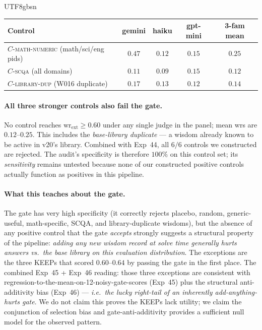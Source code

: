 \documentclass{article}
\begin{document}
\begin{CJK*}{UTF8}{gbsn}
\begin{center}\small
\begin{tabular}{l c c c c}
  \toprule
  Control & gemini & haiku & gpt-mini & 3-fam mean \\
  \midrule
  \(C\)-\textsc{math-numeric} (math/sci/eng pids) & \(0.47\) & \(0.12\) & \(0.15\) & \(0.25\) \\
  \(C\)-\textsc{scqa} (all domains)               & \(0.11\) & \(0.09\) & \(0.15\) & \(0.12\) \\
  \(C\)-\textsc{library-dup} (W016 duplicate)     & \(0.17\) & \(0.13\) & \(0.12\) & \(0.14\) \\
  \bottomrule
\end{tabular}
\end{center}

\paragraph{All three stronger controls also fail the gate.} No
control reaches \(\mathrm{wr}_{\mathrm{ext}} \geq 0.60\) under any
single judge in the panel; mean wrs are \(0.12\)--\(0.25\). This
includes the \emph{base-library duplicate} --- a wisdom already
known to be active in v20's library. Combined with Exp~44, all
\(6/6\) controls we constructed are rejected. The audit's
specificity is therefore \(100\%\) on this control set; its
\emph{sensitivity} remains untested because none of our
constructed positive controls actually function as positives in
this pipeline.

\paragraph{What this teaches about the gate.} The gate has very
high specificity (it correctly rejects placebo, random,
generic-useful, math-specific, SCQA, and library-duplicate
wisdoms), but the absence of any positive control that the gate
\emph{accepts} strongly suggests a structural property of the
pipeline: \emph{adding any new wisdom record at solve time
generally hurts answers vs.\ the base library on this evaluation
distribution}. The exceptions are the three KEEPs that scored
\(0.60\)--\(0.64\) by passing the gate in the first place. The
combined Exp~45 + Exp~46 reading: those three exceptions are
consistent with regression-to-the-mean-on-12-noisy-gate-scores
(Exp~45) plus the structural anti-additivity bias (Exp~46) ---
\emph{i.e.\ the lucky right-tail of an inherently
add-anything-hurts gate}. We do not claim this proves the
KEEPs lack utility; we claim the conjunction of selection bias
and gate-anti-additivity provides a sufficient null model for
the observed pattern.


\end{CJK*}
\end{document}
